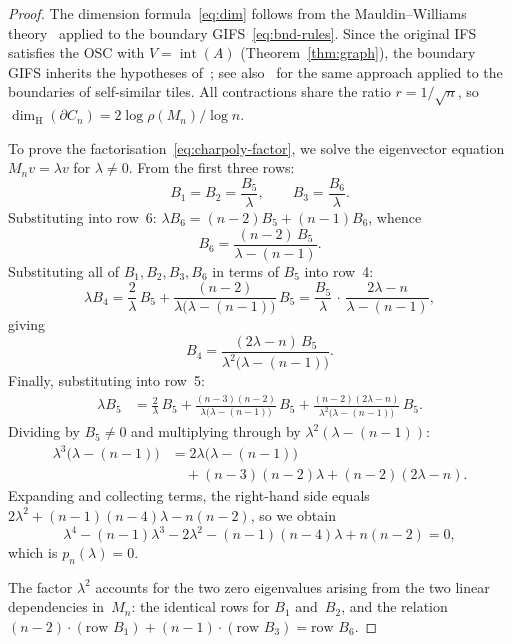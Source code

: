 \documentclass{amsart}
\theoremstyle{definition}
\theoremstyle{remark}
\newcommand{\dH}{\dim_{\mathrm{H}}}
\begin{document}
\begin{proof}
The dimension formula~\eqref{eq:dim} follows from the
Mauldin--Williams theory~\cite{mauldin-williams} applied to the
boundary GIFS~\eqref{eq:bnd-rules}.  Since the original IFS
satisfies the OSC with $V = \operatorname{int}(A)$
(Theorem~\ref{thm:graph}), the boundary GIFS inherits the
hypotheses of~\cite{mauldin-williams};
see also~\cite{duvall-keesling-strichartz} for the same approach
applied to the boundaries of self-similar tiles.  All contractions
share the ratio $r = 1/\sqrt{n}$, so
$\dH(\partial C_n) = 2\log\rho(M_n)/\log n$.

To prove the factorisation~\eqref{eq:charpoly-factor}, we solve the
eigenvector equation $M_n v = \lambda v$ for $\lambda \ne 0$.
From the first three rows:
\[
  B_1 = B_2 = \frac{B_5}{\lambda}, \qquad
  B_3 = \frac{B_6}{\lambda}.
\]
Substituting into row~6:
$\lambda B_6 = (n{-}2) B_5 + (n{-}1) B_6$, whence
\begin{equation}\label{eq:B6-from-B5}
  B_6 = \frac{(n{-}2)\, B_5}{\lambda - (n{-}1)}.
\end{equation}
Substituting all of $B_1, B_2, B_3, B_6$ in terms of $B_5$ into row~4:
\[
  \lambda B_4 = \frac{2}{\lambda}\, B_5
    + \frac{(n{-}2)}{\lambda\bigl(\lambda-(n{-}1)\bigr)}\, B_5
  = \frac{B_5}{\lambda}\,\cdot\, \frac{2\lambda - n}{\lambda - (n{-}1)},
\]
giving
\begin{equation}\label{eq:B4-from-B5}
  B_4 = \frac{(2\lambda - n)\, B_5}
    {\lambda^2\bigl(\lambda - (n{-}1)\bigr)}.
\end{equation}
Finally, substituting into row~5:
\begin{align*}
  \lambda B_5 &= \frac{2}{\lambda}\, B_5
    + \frac{(n{-}3)(n{-}2)}{\lambda\bigl(\lambda-(n{-}1)\bigr)}\, B_5
    + \frac{(n{-}2)(2\lambda-n)}
      {\lambda^2\bigl(\lambda-(n{-}1)\bigr)}\, B_5.
\end{align*}
Dividing by $B_5 \ne 0$ and multiplying through by
$\lambda^2(\lambda-(n{-}1))$:
\begin{align*}
  \lambda^3\bigl(\lambda-(n{-}1)\bigr)
  &= 2\lambda\bigl(\lambda-(n{-}1)\bigr) \\
  &\quad + (n{-}3)(n{-}2)\lambda + (n{-}2)(2\lambda-n).
\end{align*}
Expanding and collecting terms, the right-hand side equals
$2\lambda^2 + (n{-}1)(n{-}4)\lambda - n(n{-}2)$, so we obtain
\[
  \lambda^4 - (n{-}1)\lambda^3 - 2\lambda^2
    - (n{-}1)(n{-}4)\lambda + n(n{-}2) = 0,
\]
which is $p_n(\lambda) = 0$.

The factor $\lambda^2$ accounts for the two zero eigenvalues arising from
the two linear dependencies in~$M_n$: the identical rows for $B_1$
and~$B_2$, and the relation
$(n{-}2) \cdot (\text{row } B_1) + (n{-}1) \cdot (\text{row } B_3)
 = \text{row } B_6$.
\end{proof}
\end{document}
